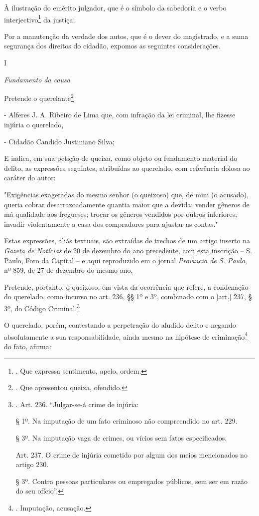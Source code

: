 À ilustração do emérito julgador, que é o símbolo da sabedoria e o verbo
interjectivo\footnote{. Que expressa sentimento, apelo, ordem.} da
justiça;

Por a manutenção da verdade dos autos, que é o dever do magistrado, e a
suma segurança dos direitos do cidadão, expomos as seguintes
considerações.

I

\emph{Fundamento da causa}

Pretende o querelante\footnote{. Que apresentou queixa, ofendido.}

- Alferes J. A. Ribeiro de Lima que, com infração da lei criminal, lhe
fizesse injúria o querelado,

- Cidadão Candido Justiniano Silva;

E indica, em sua petição de queixa, como objeto ou fundamento material
do delito, as expressões seguintes, atribuídas ao querelado, com
referência dolosa ao caráter do autor:

"Exigências exageradas do mesmo senhor (o queixoso) que, de mim (o
acusado), queria cobrar desarrazoadamente quantia maior que a devida;
vender gêneros de má qualidade aos fregueses; trocar os gêneros vendidos
por outros inferiores; invadir violentamente a casa dos compradores para
ajustar as contas."

Estas expressões, aliás textuais, são extraídas de trechos de um artigo
inserto na \emph{Gazeta de Notícias} de 20 de dezembro do ano
precedente, com esta inscrição -- S. Paulo, Foro da Capital -- e aqui
reproduzido em o jornal \emph{Província de S. Paulo}, nº 859, de 27 de
dezembro do mesmo ano.

Pretende, portanto, o queixoso, em vista da ocorrência que refere, a
condenação do querelado, como incurso no art. 236, §§ 1º e 3º, combinado
com o {[}art.{]} 237, § 3º, do Código Criminal.\footnote{. Art. 236.
  ``Julgar-se-á crime de injúria:

  § 1º. Na imputação de um fato criminoso não compreendido no art. 229.

  § 3º. Na imputação vaga de crimes, ou vícios sem fatos especificados.

  Art. 237. O crime de injúria cometido por algum dos meios mencionados
  no artigo 230.

  § 3º. Contra pessoas particulares ou empregados públicos, sem ser em
  razão do seu ofício''.}

O querelado, porém, contestando a perpetração do aludido delito e
negando absolutamente a sua responsabilidade, ainda mesmo na hipótese de
criminação\footnote{. Imputação, acusação.} do fato, afirma:

